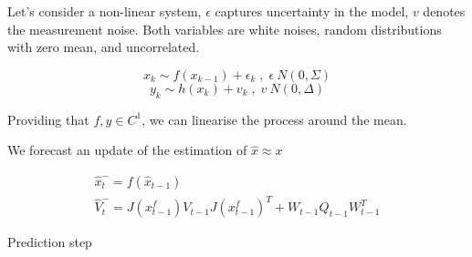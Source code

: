 \documentclass[mscthesis]{usiinfthesis}
\begin{document}
Let's consider a non-linear system, $\epsilon$ captures uncertainty in the model, $v$ denotes the measurement noise. Both variables are white noises, random distributions with zero mean, and uncorrelated. 

\[
x_k \sim f(x_{k-1}) + \epsilon_k \; , \; \epsilon ~ N(0, \Sigma)
\]
\[
y_k \sim h(x_{k}) + v_{k} \; , \; v ~ N(0, \Delta)
\]
%
%

Providing that $f, y \in C^1$, we can linearise the process around the mean. 
%
%
%
%
%
%

 We forecast an update of the estimation of $\hat{x} \approx x$

\begin{eqfloat}[H]
\begin{equation}
\begin{array}{l}
\hat{x}_t^- = f(\hat{x}_{t-1}) \\
\hat{V}_t^- = J(x^f_{t-1}) V_{t-1} J(x^f_{t-1})^T + W_{t-1} Q_{t-1} W_{t-1}^T
\end{array}
\label{eq:kalman_predict}
\end{equation}
\caption{Prediction step}
\label{eq:kalmann_prediction}
\end{eqfloat}
\end{document}
